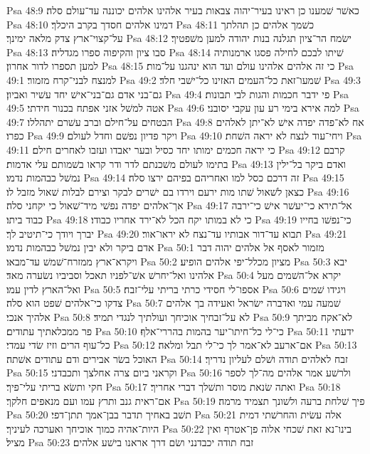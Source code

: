 Psa 48:9  כאשׁר שׁמענו כן ראינו בעיר־יהוה צבאות בעיר אלהינו אלהים יכוננה עד־עולם סלה׃
Psa 48:10  דמינו אלהים חסדך בקרב היכלך׃
Psa 48:11  כשׁמך אלהים כן תהלתך על־קצוי־ארץ צדק מלאה ימינך׃
Psa 48:12  ישׂמח הר־ציון תגלנה בנות יהודה למען משׁפטיך׃
Psa 48:13  סבו ציון והקיפוה ספרו מגדליה׃
Psa 48:14  שׁיתו לבכם לחילה פסגו ארמנותיה למען תספרו לדור אחרון׃
Psa 48:15  כי זה אלהים אלהינו עולם ועד הוא ינהגנו על־מות׃
Psa 49:1  למנצח לבני־קרח מזמור׃
Psa 49:2  שׁמעו־זאת כל־העמים האזינו כל־ישׁבי חלד׃
Psa 49:3  גם־בני אדם גם־בני־אישׁ יחד עשׁיר ואביון׃
Psa 49:4  פי ידבר חכמות והגות לבי תבונות׃
Psa 49:5  אטה למשׁל אזני אפתח בכנור חידתי׃
Psa 49:6  למה אירא בימי רע עון עקבי יסובני׃
Psa 49:7  הבטחים על־חילם וברב עשׁרם יתהללו׃
Psa 49:8  אח לא־פדה יפדה אישׁ לא־יתן לאלהים כפרו׃
Psa 49:9  ויקר פדיון נפשׁם וחדל לעולם׃
Psa 49:10  ויחי־עוד לנצח לא יראה השׁחת׃
Psa 49:11  כי יראה חכמים ימותו יחד כסיל ובער יאבדו ועזבו לאחרים חילם׃
Psa 49:12  קרבם בתימו לעולם משׁכנתם לדר ודר קראו בשׁמותם עלי אדמות׃
Psa 49:13  ואדם ביקר בל־ילין נמשׁל כבהמות נדמו׃
Psa 49:14  זה דרכם כסל למו ואחריהם בפיהם ירצו סלה׃
Psa 49:15  כצאן לשׁאול שׁתו מות ירעם וירדו בם ישׁרים לבקר וצירם לבלות שׁאול מזבל לו׃
Psa 49:16  אך־אלהים יפדה נפשׁי מיד־שׁאול כי יקחני סלה׃
Psa 49:17  אל־תירא כי־יעשׁר אישׁ כי־ירבה כבוד ביתו׃
Psa 49:18  כי לא במותו יקח הכל לא־ירד אחריו כבודו׃
Psa 49:19  כי־נפשׁו בחייו יברך ויודך כי־תיטיב לך׃
Psa 49:20  תבוא עד־דור אבותיו עד־נצח לא יראו־אור׃
Psa 49:21  אדם ביקר ולא יבין נמשׁל כבהמות נדמו׃
Psa 50:1  מזמור לאסף אל אלהים יהוה דבר ויקרא־ארץ ממזרח־שׁמשׁ עד־מבאו׃
Psa 50:2  מציון מכלל־יפי אלהים הופיע׃
Psa 50:3  יבא אלהינו ואל־יחרשׁ אשׁ־לפניו תאכל וסביביו נשׂערה מאד׃
Psa 50:4  יקרא אל־השׁמים מעל ואל־הארץ לדין עמו׃
Psa 50:5  אספו־לי חסידי כרתי בריתי עלי־זבח׃
Psa 50:6  ויגידו שׁמים צדקו כי־אלהים שׁפט הוא סלה׃
Psa 50:7  שׁמעה עמי ואדברה ישׂראל ואעידה בך אלהים אלהיך אנכי׃
Psa 50:8  לא על־זבחיך אוכיחך ועולתיך לנגדי תמיד׃
Psa 50:9  לא־אקח מביתך פר ממכלאתיך עתודים׃
Psa 50:10  כי־לי כל־חיתו־יער בהמות בהררי־אלף׃
Psa 50:11  ידעתי כל־עוף הרים וזיז שׂדי עמדי׃
Psa 50:12  אם־ארעב לא־אמר לך כי־לי תבל ומלאה׃
Psa 50:13  האוכל בשׂר אבירים ודם עתודים אשׁתה׃
Psa 50:14  זבח לאלהים תודה ושׁלם לעליון נדריך׃
Psa 50:15  וקראני ביום צרה אחלצך ותכבדני׃
Psa 50:16  ולרשׁע אמר אלהים מה־לך לספר חקי ותשׂא בריתי עלי־פיך׃
Psa 50:17  ואתה שׂנאת מוסר ותשׁלך דברי אחריך׃
Psa 50:18  אם־ראית גנב ותרץ עמו ועם מנאפים חלקך׃
Psa 50:19  פיך שׁלחת ברעה ולשׁונך תצמיד מרמה׃
Psa 50:20  תשׁב באחיך תדבר בבן־אמך תתן־דפי׃
Psa 50:21  אלה עשׂית והחרשׁתי דמית היות־אהיה כמוך אוכיחך ואערכה לעיניך׃
Psa 50:22  בינו־נא זאת שׁכחי אלוה פן־אטרף ואין מציל׃
Psa 50:23  זבח תודה יכבדנני ושׂם דרך אראנו בישׁע אלהים׃
